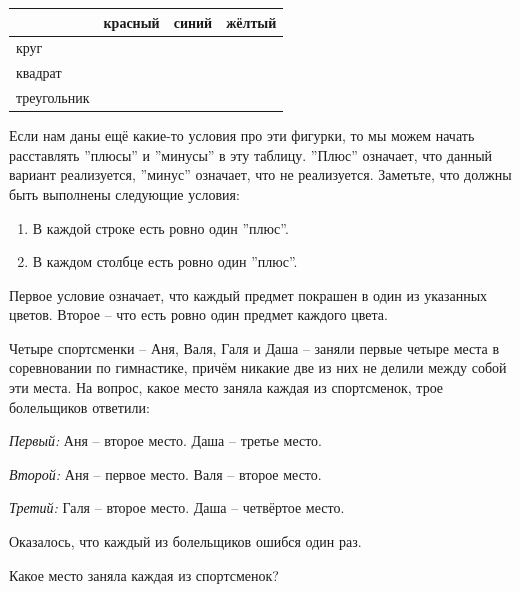 \begin{center}
\begin{tabular}{ | m{3cm} | m{3cm}| m{3cm} | m{3cm} | } 
  \hline
  & красный & синий & жёлтый \\ 
  \hline
  круг &    &   & \\ 
  \hline
  квадрат &    &   & \\ 
  \hline
  треугольник &    &   & \\ 
  \hline
\end{tabular}
\end{center}

Если нам даны ещё какие-то условия про эти фигурки, то мы можем начать расставлять ''плюсы'' и ''минусы'' в эту таблицу. ''Плюс'' означает, что данный вариант реализуется, ''минус'' означает, что не реализуется. Заметьте, что должны быть выполнены следующие условия:

\begin{enumerate}
    \item В каждой строке есть ровно один ''плюс''.
    \item В каждом столбце есть ровно один ''плюс''.
\end{enumerate}

Первое условие означает, что каждый предмет покрашен в один из указанных цветов. Второе – что есть ровно один предмет каждого цвета.

\newpage

\begin{thm}
    Четыре спортсменки – Аня, Валя, Галя и Даша – заняли первые четыре места в соревновании по гимнастике, причём никакие две из них не делили между собой эти места. На вопрос, какое место заняла каждая из спортсменок, трое болельщиков ответили:
    \par
    \textit{Первый:} Аня – второе место. Даша – третье место.
    \par
    \textit{Второй:} Аня – первое место. Валя – второе место.
    \par
    \textit{Третий:} Галя – второе место. Даша – четвёртое место.
    \par
    Оказалось, что каждый из болельщиков ошибся один раз.
    \par
    Какое место заняла каждая из спортсменок?
\end{thm}

